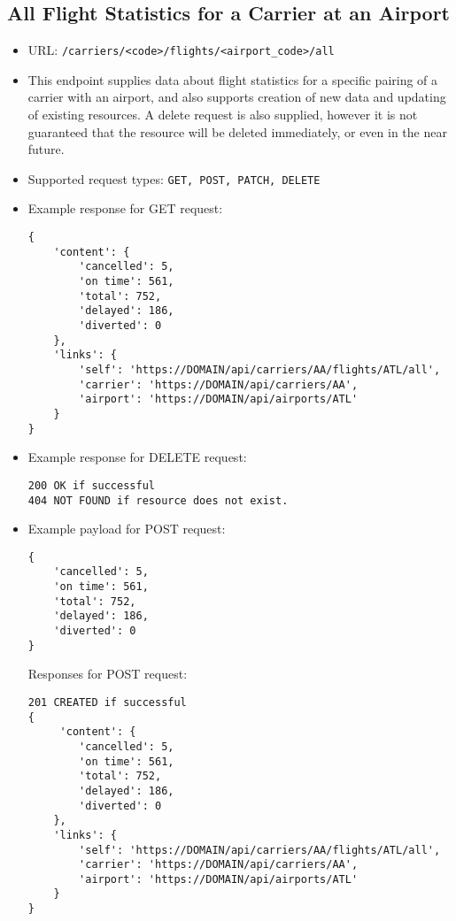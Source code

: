 \documentclass{article}
\begin{document}
    \subsection{All Flight Statistics for a Carrier at an Airport}
        \begin{itemize}
			\item URL: \texttt{/carriers/<code>/flights/<airport\_code>/all}
			\item This endpoint supplies data about flight statistics for a specific pairing of a carrier with an airport, and also supports creation of new data and updating of existing resources. A delete request is also supplied, however it is not guaranteed that the resource will be deleted immediately, or even in the near future.
			\item Supported request types: \texttt{GET, POST, PATCH, DELETE}
			\item Example response for GET request:
			\begin{lstlisting}
{
    'content': {
        'cancelled': 5,
        'on time': 561,
        'total': 752,
        'delayed': 186,
        'diverted': 0
    },
    'links': {
        'self': 'https://DOMAIN/api/carriers/AA/flights/ATL/all',
        'carrier': 'https://DOMAIN/api/carriers/AA',
        'airport': 'https://DOMAIN/api/airports/ATL'
    }
}

			\end{lstlisting}
			\item Example response for DELETE request:
			\begin{lstlisting}
200 OK if successful
404 NOT FOUND if resource does not exist.
			\end{lstlisting}
			
			\item Example payload for POST request:
    			\begin{lstlisting}
{
    'cancelled': 5,
    'on time': 561,
    'total': 752,
    'delayed': 186,
    'diverted': 0
}
    			\end{lstlisting}
    			
    			Responses for POST request:
    			\begin{lstlisting}
201 CREATED if successful
{
     'content': {
        'cancelled': 5,
        'on time': 561,
        'total': 752,
        'delayed': 186,
        'diverted': 0
    },
    'links': {
        'self': 'https://DOMAIN/api/carriers/AA/flights/ATL/all',
        'carrier': 'https://DOMAIN/api/carriers/AA',
        'airport': 'https://DOMAIN/api/airports/ATL'
    }
}


\end{lstlisting}
\end{itemize}
\end{document}
